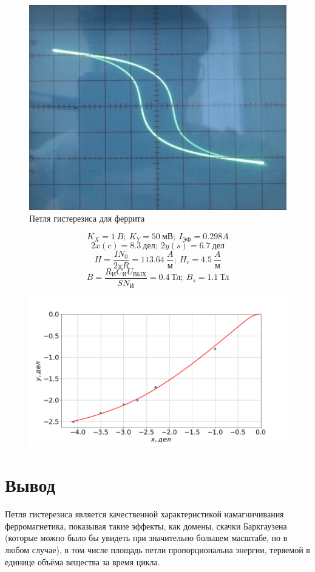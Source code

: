 \documentclass[a4paper, fontsize=14pt]{article}
\begin{document}
\begin{figure}[H]
\center
\includegraphics[scale=0.1]{fer.jpg}
\caption{Петля гистерезиса для феррита}
\end{figure}

\[
	K_X = 1\ B;\ K_Y = 50\ \text{мВ};\ I_\text{ЭФ} = 0.298 A
\]
\[
	2x(c) = 8.3\ \text{дел};\ 2y(s) = 6.7\ \text{дел}
\]
\[
	H = \frac{I N_0}{2 \pi R} = 113.64\ \frac{A}{\text{м}};\ H_c = 4.5\ \frac{A}{\text{м}}
\]
\[
B = \frac{R_\text{И} C_\text{И} U_\text{ВЫХ}}{S N_\text{И}} = 0.4\ \text{Тл};\ B_s = 1.1\ \text{Тл}
\]
\begin{figure}[H]
\center
\includegraphics[scale=0.4]{33.png}

\end{figure}
\section*{Вывод}
Петля гистерезиса является качественной характеристикой намагничивания ферромагнетика, показывая такие эффекты, как домены, скачки Баркгаузена (которые можно было бы увидеть при значительно большем масштабе, но в любом случае), в том числе площадь петли пропорциональна энергии, теряемой в единице объёма вещества за время цикла.
\end{document}
